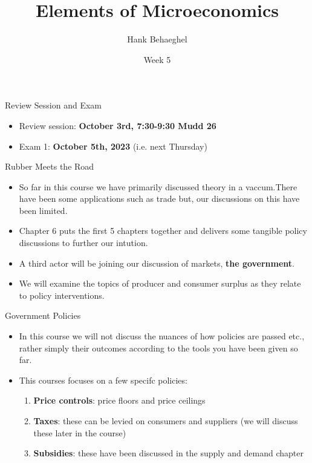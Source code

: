 \documentclass[aspectratio=169]{beamer}
\title{Elements of Microeconomics}
\author{Hank Behaeghel}
\institute{Johns Hopkins University}
\date{Week 5}
\begin{document}
\maketitle

\begin{frame}{Review Session and Exam}
    \begin{itemize}
        \item Review session: \textbf{October 3rd, 7:30-9:30 Mudd 26}
        \vspace*{5mm}
        \item Exam 1: \textbf{October 5th, 2023} (i.e. next Thursday)
    \end{itemize}
    
\end{frame}

\begin{frame}{Rubber Meets the Road}
    \begin{itemize}
        \item So far in this course we have primarily discussed theory in a vaccum.There have been some applications such as trade but, our discussions on this have been limited.
        \item Chapter 6 puts the first 5 chapters together and delivers some tangible policy discussions to further our intution.
        \item A third actor will be joining our discussion of markets, \textbf{the government}.
        \item We will examine the topics of producer and consumer surplus as they relate to policy interventions.
    \end{itemize}

\end{frame}

\begin{frame}{Government Policies}
    \begin{itemize}
        \item In this course we will not discuss the nuances of how policies are passed etc., rather simply their outcomes according to the tools you have been given so far.
        \vspace{5mm}
        \item This courses focuses on a few specifc policies:
        \vspace{2mm}
            \begin{enumerate}
                \item \textbf{Price controls}: price floors and price ceilings
                \vspace{1mm}
                \item \textbf{Taxes}: these can be levied on consumers and suppliers (we will discuss these later in the course)
                \vspace{1mm}
                \item \textbf{Subsidies}: these have been discussed in the supply and demand chapter
            \end{enumerate}
    \end{itemize}
    
\end{frame}
\end{document}
